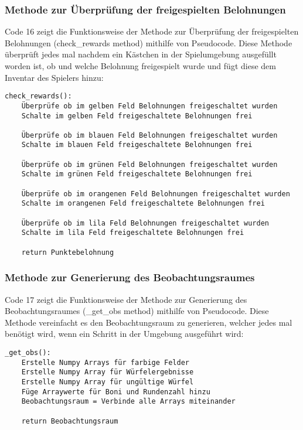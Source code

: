 \subsubsection{Methode zur Überprüfung der freigespielten Belohnungen}
\begin{minipage}{\linewidth}
Code 16 zeigt die Funktionsweise der Methode zur Überprüfung der freigespielten Belohnungen (check\_rewards method) mithilfe von Pseudocode. Diese Methode überprüft jedes mal nachdem ein Kästchen in der Spielumgebung ausgefüllt worden ist, ob und welche Belohnung freigespielt wurde und fügt diese dem Inventar des Spielers hinzu:
\vspace{0.5cm}
\begin{lstlisting}[caption={Methode zur Überprüfung der freigespielten Belohnungen}]
check_rewards():
	Überprüfe ob im gelben Feld Belohnungen freigeschaltet wurden
	Schalte im gelben Feld freigeschaltete Belohnungen frei
	
	Überprüfe ob im blauen Feld Belohnungen freigeschaltet wurden
	Schalte im blauen Feld freigeschaltete Belohnungen frei
	
	Überprüfe ob im grünen Feld Belohnungen freigeschaltet wurden
	Schalte im grünen Feld freigeschaltete Belohnungen frei
	
	Überprüfe ob im orangenen Feld Belohnungen freigeschaltet wurden
	Schalte im orangenen Feld freigeschaltete Belohnungen frei
	
	Überprüfe ob im lila Feld Belohnungen freigeschaltet wurden
	Schalte im lila Feld freigeschaltete Belohnungen frei
	
	return Punktebelohnung
\end{lstlisting}
\end{minipage}

\subsubsection{Methode zur Generierung des Beobachtungsraumes}
\begin{minipage}{\linewidth}
Code 17 zeigt die Funktionsweise der Methode zur Generierung des Beobachtungsraumes (\_get\_obs method) mithilfe von Pseudocode. Diese Methode vereinfacht es den Beobachtungsraum zu generieren, welcher jedes mal benötigt wird, wenn ein Schritt in der Umgebung ausgeführt wird:
\vspace{0.5cm}
\begin{lstlisting}[caption={Methode zur Generierung des Beobachtungsraumes}]
_get_obs():
	Erstelle Numpy Arrays für farbige Felder
	Erstelle Numpy Array für Würfelergebnisse
	Erstelle Numpy Array für ungültige Würfel
	Füge Arraywerte für Boni und Rundenzahl hinzu
	Beobachtungsraum = Verbinde alle Arrays miteinander
	
	return Beobachtungsraum
\end{lstlisting}
\end{minipage}

